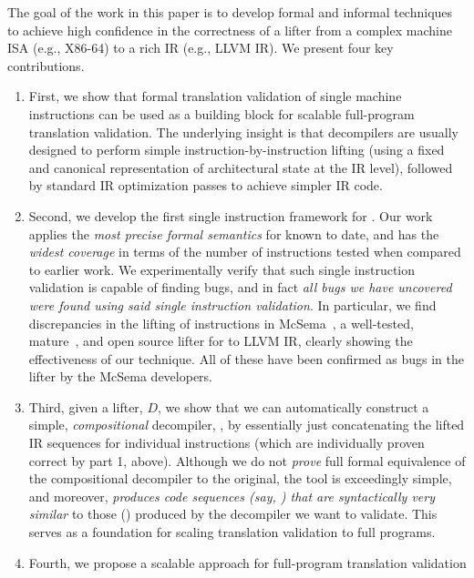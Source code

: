 The goal of the work in this paper is to develop formal and informal techniques
to achieve high confidence in the correctness of a lifter from a complex machine
ISA (e.g., X86-64) to a rich IR (e.g., LLVM IR).
%
We present four key contributions.
%
\begin{enumerate}
  \item First, we show that formal translation validation of single machine 
  instructions can be used as a building 
  block for scalable
  full-program translation validation.  The underlying insight is that decompilers are
  usually designed to perform simple instruction-by-instruction lifting
  (using a fixed and canonical representation of architectural state at the IR
  level), followed by standard IR optimization passes to achieve simpler IR
  code.
  \item Second, we develop the first single instruction \tv framework for \ISA.
  Our work applies the \emph{most precise formal
  semantics} for \ISA known to date, and has the \emph{widest coverage} in terms
  of the number of instructions tested when compared to earlier work.
  We experimentally verify that such single instruction validation
  is capable of finding bugs, and in fact \emph{all bugs we have uncovered were
  found using said single instruction validation}.  
  In particular, we find
  discrepancies in the lifting of \sivFail instructions in McSema~\cite{McSema:Recon14,Remill}, 
  a well-tested, mature~\cite{McSema:Compare}, and  open source lifter for \ISA to 
  LLVM IR, clearly showing the
  effectiveness of our technique.  All of these have been confirmed as bugs in
  the lifter by the McSema developers.
  \item Third, given a lifter, $D$, we show that we can automatically construct a 
  simple, \emph{compositional} decompiler, \Dp,
  by essentially just concatenating the lifted IR sequences for individual instructions
  (which are individually proven correct by part 1, above).  Although we do not
  \emph{prove} full formal equivalence of the compositional decompiler to the original,
  the tool is exceedingly simple, and moreover, 
  \emph{produces code sequences (say, \Tp) that are syntactically very similar} to those 
  () produced by the decompiler we want to validate.
  This serves as a foundation for scaling translation validation to full programs.
%
  \item Fourth, we propose a scalable approach for full-program translation validation

\end{enumerate}
